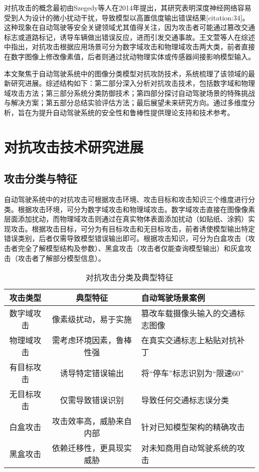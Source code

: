\documentclass[acmtog]{ctexart}
\begin{document}
对抗攻击的概念最初由Szegedy等人在2014年提出，其研究表明深度神经网络容易受到人为设计的微小扰动干扰，导致模型以高置信度输出错误结果[citation:34]。这种现象在自动驾驶等安全关键领域尤其值得关注，因为攻击者可能通过篡改交通标志或道路标记，诱导车辆做出错误反应，进而引发交通事故。王文萱等人在综述中指出，对抗攻击根据应用场景可分为数字域攻击和物理域攻击两大类，前者直接在数字图像上修改像素值，后者则通过扰动物理实体或传感器间接影响模型输入。

本文聚焦于自动驾驶系统中的图像分类模型对抗攻防技术，系统梳理了该领域的最新研究进展。综述结构如下：第二部分深入分析对抗攻击技术，包括数字域和物理域攻击方法；第三部分系统分类防御技术；第四部分探讨自动驾驶场景的特殊挑战与解决方案；第五部分总结实验评估方法；最后展望未来研究方向。通过多维度分析，旨在为提升自动驾驶系统的安全性和鲁棒性提供理论支持和技术参考。

\section{对抗攻击技术研究进展}

\subsection{攻击分类与特征}

自动驾驶系统中的对抗攻击可根据攻击环境、攻击目标和攻击知识三个维度进行分类。根据攻击环境，可分为数字域攻击和物理域攻击。数字域攻击直接在图像像素层面添加扰动，而物理域攻击则通过在真实物体表面添加扰动（如贴纸、涂鸦）实现攻击。根据攻击目标，可分为有目标攻击和无目标攻击，前者诱使模型输出特定错误类别，后者仅需导致模型错误输出即可。根据攻击知识，可分为白盒攻击（攻击者完全了解模型结构及参数）、黑盒攻击（攻击者仅能查询模型输出）和灰盒攻击（攻击者了解部分模型信息）。

\begin{table}
  \caption{对抗攻击分类及典型特征}
  \label{tab:freq}
  \begin{tabular}{ccl}
    \toprule
    攻击类型&典型特征&自动驾驶场景案例\\
    \midrule
    数字域攻击&像素级扰动，易于实施&篡改车载摄像头输入的交通标志图像\\
    物理域攻击&需考虑环境因素，鲁棒性强&在真实交通标志上粘贴对抗补丁\\
    有目标攻击&诱导特定错误输出&将“停车”标志识别为“限速60”\\
    无目标攻击&仅需导致错误识别&导致任何交通标志误分类\\
    白盒攻击&攻击效率高，威胁来自内部&针对已知模型架构的精确攻击\\
    黑盒攻击&依赖迁移性，更具现实威胁&对未知商用自动驾驶系统的攻击\\
  \bottomrule
\end{tabular}
\end{table}
\end{document}
